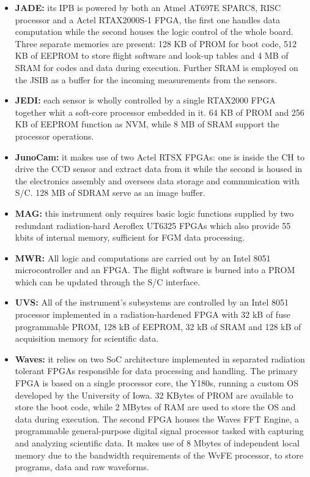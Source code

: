 \begin{itemize}
    \item \textbf{JADE:} its IPB is powered by both an Atmel AT697E SPARC8, RISC processor and a Actel RTAX2000S-1 FPGA, the first one handles data computation while the second houses the logic control of the whole board. Three separate memories are present: 128 KB of PROM for boot code, 512 KB of EEPROM to store flight software and look-up tables and 4 MB of SRAM for codes and data during execution. Further SRAM is employed on the JSIB as a buffer for the incoming measurements from the sensors. \cite{JADE_info}
    \item \textbf{JEDI:} each sensor is wholly controlled by a single RTAX2000 FPGA together whit a soft-core processor embedded in it. 64 KB of PROM and 256 KB of EEPROM function as NVM, while 8 MB of SRAM support the processor operations. \cite{JEDI_info}
    \item \textbf{JunoCam:} it makes use of two Actel RTSX FPGAs: one is inside the CH to drive the CCD sensor and extract data from it while the second is housed in the electronics assembly and oversees data storage and communication with S/C. 128 MB of SDRAM serve as an image buffer. \cite{JunoCam_info}
    \item \textbf{MAG:} this instrument only requires basic logic functions supplied by two redundant radiation-hard Aeroflex UT6325 FPGAs which also provide 55 kbits of internal memory, sufficient for FGM data processing. \cite{MAG_info}
    \item \textbf{MWR:} All logic and computations are carried out by an Intel 8051 microcontroller and an FPGA. The flight software is burned into a PROM which can be updated through the S/C interface. \cite{MWR_info}
    \item \textbf{UVS:} All of the instrument's subsystems are controlled by an Intel 8051 processor implemented in a radiation-hardened FPGA with 32 kB of fuse programmable PROM, 128 kB of EEPROM, 32 kB of SRAM and 128 kB of acquisition memory for scientific data. \cite{UVS_info}
    \item \textbf{Waves:} it relies on two SoC architecture implemented in separated radiation tolerant FPGAs responsible for data processing and handling. The primary FPGA is based on a single processor core, the Y180s, running a custom OS developed by the University of Iowa. 32 KBytes of PROM are available to store the boot code, while 2 MBytes of RAM are used to store the OS and data during execution. The second FPGA houses the Waves FFT Engine, a programmable general-purpose digital signal processor tasked with capturing and analyzing scientific data. It makes use of 8 Mbytes of independent local memory due to the bandwidth requirements of the WvFE processor, to store programs, data and raw waveforms. \cite{Waves_info}  

\end{itemize}
